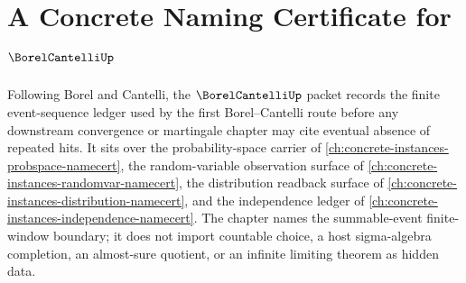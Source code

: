 \chapter{A Concrete Naming Certificate for $\BorelCantelliUp$}
\label{ch:concrete-instances-borel-cantelli-namecert}

Following Borel and Cantelli, the $\BorelCantelliUp$ packet records the finite event-sequence ledger used by the first Borel--Cantelli route before any downstream convergence or martingale chapter may cite eventual absence of repeated hits. It sits over the probability-space carrier of \autoref{ch:concrete-instances-probspace-namecert}, the random-variable observation surface of \autoref{ch:concrete-instances-randomvar-namecert}, the distribution readback surface of \autoref{ch:concrete-instances-distribution-namecert}, and the independence ledger of \autoref{ch:concrete-instances-independence-namecert}. The chapter names the summable-event finite-window boundary; it does not import countable choice, a host sigma-algebra completion, an almost-sure quotient, or an infinite limiting theorem as hidden data.

